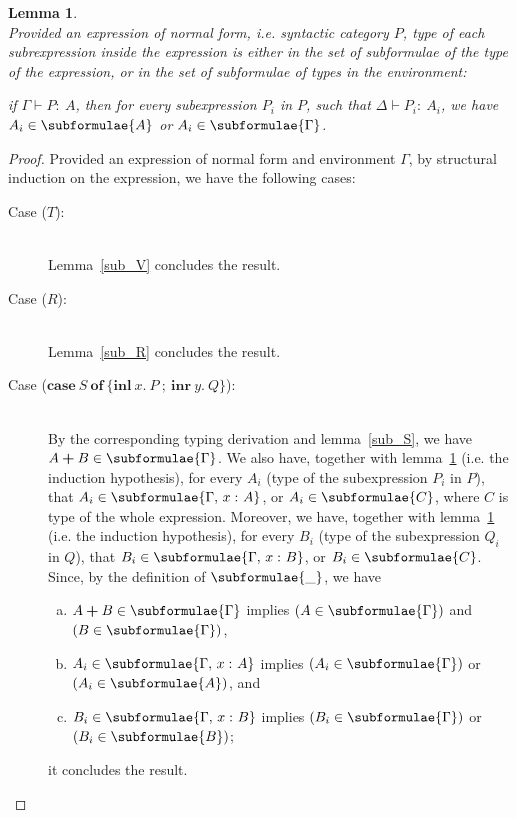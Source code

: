 \documentclass[a4paper]{article}
\newcommand{\typecolor}{}
\newcommand{\termcolor}{}
\newcommand{\tp}[1]{{\typecolor #1}}
\newcommand{\tm}[1]{{\termcolor #1}}
\newtheorem{lemma}[theorem]{Lemma}
\newcommand{\typsum}[2]{#1\boldsymbol{+}#2}
\newcommand{\expcas}[5]{\mathbf{case}\ #1\ \mathbf{of}\ \boldsymbol{\{}\mathbf{inl}\ #2.\ #3\ \boldsymbol{;}\ \mathbf{inr}\ #4.\ #5\boldsymbol{\}}}
\newcommand{\typing}[2]{\tm{#1:\ }\tp{#2}}
\newcommand{\typenvcon}[2]{\tp{\Gamma,}\ \typing{#1}{#2}}
\begin{document}
\begin{lemma}\ \\
\label{sub_P}
Provided an expression of normal form, i.e. syntactic category $P$,
type of each subrexpression inside the expression is either in the set of
subformulae of the type of the expression, or in the set
of subformulae of types in the environment:

 if $\Gamma \vdash \typing{P}{A}$, then for every subexpression $P_i$
 in $P$, such that $\Delta \vdash \typing{P_i}{A_i}$, we have $A_i \in
 \subformulae{A}$ or $A_i \in \subformulae{\Gamma}$. 
\end{lemma}
\begin{proof}
Provided an expression of normal form and environment $\Gamma$,
by structural induction on the expression, we have the following cases:
\begin{description}
\item[Case ($T$):]\ \\
  Lemma~\ref{sub_V} concludes the result.
\item[Case ($R$):]\ \\
  Lemma~\ref{sub_R} concludes the result.
\item[Case ($\expcas{S}{x}{P}{y}{Q}$):]\ \\
  By the corresponding typing derivation and lemma~\ref{sub_S}, we
  have $\typsum{A}{B} \in \subformulae{\Gamma}$. We also have,
  together with lemma~\ref{sub_P} (i.e. the induction hypothesis), for
  every $A_i$ (type of the subexpression $P_i$ in $P$), that $A_i \in
  \subformulae{\typenvcon{x}{A}}$, or $A_i \in \subformulae{C}$, where
  $C$ is type of the whole expression. Moreover, we have, together
  with lemma~\ref{sub_P} (i.e. the induction hypothesis), for every
  $B_i$ (type of the subexpression $Q_i$ in $Q$), that $B_i \in
  \subformulae{\typenvcon{x}{B}}$, or $B_i \in \subformulae{C}$.
  Since, by the definition of $\subformulae{\_}$, we have
  \begin{enumerate}[(a)] 
     \item $\typsum{A}{B} \in \subformulae{\Gamma}$ implies $(A \in \subformulae{\Gamma})$ and $(B \in \subformulae{\Gamma})$,
     \item $A_i \in \subformulae{\typenvcon{x}{A}}$ implies $(A_i \in \subformulae{\Gamma})$ or $(A_i \in \subformulae{A})$, and
     \item $B_i \in \subformulae{\typenvcon{x}{B}}$ implies $(B_i \in \subformulae{\Gamma})$ or $(B_i \in \subformulae{B})$; 
  \end{enumerate}
  it concludes the result. 

\end{description}
\end{proof}
\end{document}
